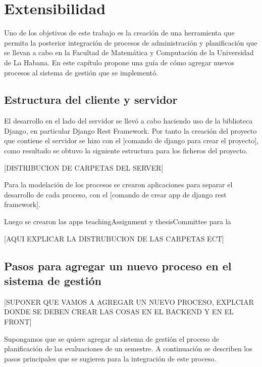 \chapter{Extensibilidad}\label{chapter:extensibility}
Uno de los objetivos de este trabajo es la creación de una herramienta que 
permita la posterior integración de procesos de administración y planificación 
que se llevan a cabo en la Facultad de Matemática y Computación de la Universidad
de La Habana. 
En este capítulo propone una guía de cómo agregar nuevos 
procesos al sistema de gestión que se implementó.

\section{Estructura del cliente y servidor}
El desarrollo en el lado del servidor se llevó a cabo haciendo 
uso de la biblioteca Django, en particular Django Rest Framework. 
Por tanto la creación del proyecto que contiene el servidor se hizo 
con el [comando de django para crear el proyecto], como resultado 
se obtuvo la siguiente estructura para los ficheros del proyecto.

[DISTRIBUCION DE CARPETAS DEL SERVER]

Para la modelación de los procesos se crearon aplicaciones para separar 
el desarrollo de cada proceso, con el [comando de crear app de django rest framework]. 

Luego se crearon las apps teachingAssignment y thesisCommittee para la 

[AQUI EXPLICAR LA DISTRUBUCION DE LAS CARPETAS ECT]

\section{Pasos para agregar un nuevo proceso en el sistema de gestión}
[SUPONER QUE VAMOS A AGREGAR UN NUEVO PROCESO, EXPLCIAR DONDE SE DEBEN CREAR LAS 
COSAS EN EL BACKEND Y EN EL FRONT]


Supongamos que se quiere agregar al sistema de gestión el proceso de planificación de 
las evaluaciones de un semestre. A continuación se describen los pasos principales
que se sugieren para la integración de este proceso.

